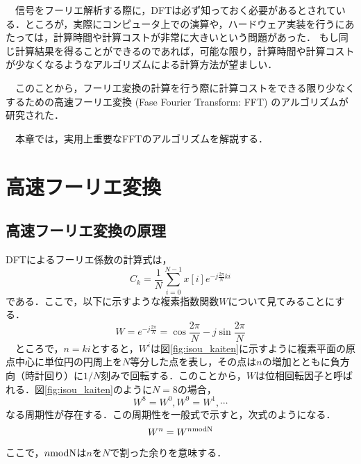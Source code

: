 
\begin{lead}

　信号をフーリエ解析する際に，DFTは必ず知っておく必要があるとされている．ところが，実際にコンピュータ上での演算や，ハードウェア実装を行うにあたっては，計算時間や計算コストが非常に大きいという問題があった．
%
もし同じ計算結果を得ることができるのであれば，可能な限り，計算時間や計算コストが少なくなるようなアルゴリズムによる計算方法が望ましい．

　このことから，フーリエ変換の計算を行う際に計算コストをできる限り少なくするための高速フーリエ変換 (Fase Fourier Transform: FFT) のアルゴリズムが研究された．

　本章では，実用上重要なFFTのアルゴリズムを解説する．

\end{lead}




\chapter{高速フーリエ変換}
\label{chapter:fft}

\section{高速フーリエ変換の原理}

DFTによるフーリエ係数の計算式は，
\begin{equation}
C_k=\frac{1}{N}\sum^{N-1}_{i=0}x[i] e^{-j\frac{2\pi}{N}ki}
\label{eqn:dft51}
\end{equation}
である．ここで，以下に示すような複素指数関数$W$について見てみることにする．
\begin{equation}
W=e^{-j\frac{2\pi}{N}} = \cos \frac{2\pi}{N} -j\sin \frac{2\pi}{N}
\end{equation}
　ところで，$n=ki$とすると，$W^i$は図\ref{fig:isou_kaiten}に示すように複素平面の原点中心に単位円の円周上を$N$等分した点を表し，その点は$n$の増加とともに負方向（時計回り）に$1/N$刻みで回転する．このことから，$W$は位相回転因子と呼ばれる．図\ref{fig:isou_kaiten}のように$N=8$の場合，
\begin{equation}
W^8=W^0, W^9=W^1, \cdots \nonumber
\end{equation}
なる周期性が存在する．この周期性を一般式で示すと，次式のようになる．
\begin{equation}
W^n=W^{n\rm{mod}N}
\end{equation}
ここで，$n\rm{mod}N$は$n$を$N$で割った余りを意味する．

